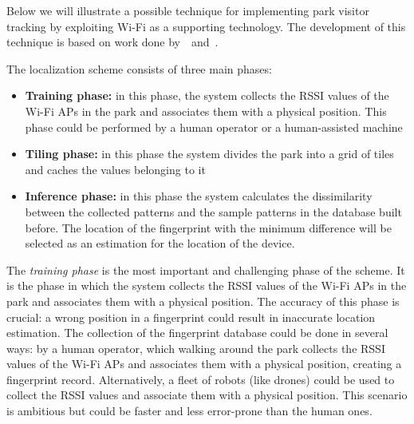 Below we will illustrate a possible technique for implementing park visitor tracking by exploiting Wi-Fi as a supporting technology.
The development of this technique is based on work done by~\cite{du2018hybrid}~and~\cite{chaudhry2013indoor}.

The localization scheme consists of three main phases:

\begin{itemize}
	\item \textbf{Training phase:} in this phase, the system collects the RSSI values of the Wi-Fi APs in the park and associates them with a
	      physical position. This phase could be performed by a human operator or a human-assisted machine
	\item \textbf{Tiling phase:} in this phase the system divides the park into a grid of tiles and caches the values belonging to it
	\item \textbf{Inference phase:} in this phase the system calculates the dissimilarity between the collected patterns and the sample
	      patterns in the database built before. The location of the fingerprint with the minimum difference will be selected as an estimation for the
	      location of the device.
\end{itemize}

The \textit{training phase} is the most important and challenging phase of the scheme. It is the phase in which the system collects the RSSI values
of the Wi-Fi APs in the park and associates them with a physical position. The accuracy of this phase is crucial: a wrong position in a fingerprint
could result in inaccurate location estimation. The collection of the fingerprint database could be done in several ways: by a human operator, which
walking around the park collects the RSSI values of the Wi-Fi APs and associates them with a physical position, creating a fingerprint record.
Alternatively, a fleet of robots (like drones) could be used to collect the RSSI values and associate them with a physical position. This scenario
is ambitious but could be faster and less error-prone than the human ones.

